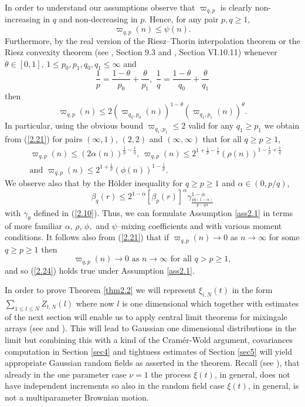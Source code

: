 In order to understand our assumptions observe that $\varpi_{q,p}$
 is clearly non-increasing in $q$ and non-decreasing in $p$. Hence,
 for any pair $p,q\geq 1$,
 \[
 \varpi_{q,p}(n)\leq\psi(n).
 \]
 Furthermore, by the real version of the Riesz--Thorin interpolation 
 theorem or the Riesz convexity theorem (see \cite{Ga}, Section 9.3
 and \cite{DS}, Section VI.10.11) whenever $\theta\in[0,1],\, 1\leq
 p_0,p_1,q_0,q_1\leq\infty$ and
 \[
 \frac 1p=\frac {1-\theta}{p_0}+\frac \theta{p_1},\,\,\frac 1q=\frac
 {1-\theta}{q_0}+\frac \theta{q_1}
 \]
 then
 \begin{equation}\label{2.21}
\varpi_{q,p}(n)\le 2(\varpi_{q_0,p_0}(n))^{1-\theta}
(\varpi_{q_1,p_1}(n))^\theta.
\end{equation}
In particular,  using the obvious bound $\varpi_{q_1,p_1}\leq 2$
valid for any $q_1\geq p_1$ we obtain from (\ref{2.21}) for pairs
$(\infty,1)$, $(2,2)$ and $(\infty,\infty)$ that for all $q\geq p\geq 1$,
 \begin{eqnarray}\label{2.22}
&\varpi_{q,p}(n)\le (2\alpha(n))^{\frac{1}{p}-\frac{1}{q}},\,
 \varpi_{q,p}(n)\le 2^{1+\frac 1p-\frac 1q}(\rho(n))^{1-\frac 1p+\frac 1q}\\
&\mbox{and}\,\,\varpi_{q,p}(n)\le 2^{1+\frac 1p}(\phi(n))^{1-\frac 1p}.
\nonumber\end{eqnarray}
We observe also that by the H\" older inequality for $q\geq p\geq 1$
and $\alpha\in(0,p/q)$,
\begin{equation}\label{2.23}
\beta_q(r)\le 2^{1-\alpha}  [\beta_p(r)]^\alpha \gamma^{1-{{\alpha}}}_{\frac{pq(1-{{\alpha}})}
{p-q{{\alpha}}}}
\end{equation}
with $\gamma_\theta$ defined in (\ref{2.10}). Thus, we can formulate 
Assumption \ref{ass2.1} in terms of more familiar $\alpha,\,\rho,\,\phi,$
and $\psi$--mixing coefficients and with various moment conditions. It 
follows also from (\ref{2.21}) that if $\varpi_{q,p}(n)\to 0$ as $n\to\infty$
for some $q\geq p\geq 1$ then
\begin{equation}\label{2.24}
\varpi_{q,p}(n)\to 0\,\,\mbox{as}\,\, n\to\infty\,\,\mbox{for all}\,\,
q> p\geq 1,
\end{equation}
and so (\ref{2.24}) holds true under Assumption \ref{ass2.1}.

In order to prove Theorem \ref{thm2.2} we will represent $\xi_{i,N}(t)$ 
in the form $\sum_{1\leq l\leq N}Z_{t,N}(l)$ where now $l$ is one dimensional
which together with estimates of the next section will enable us to apply 
central limit theorems for mixingale arrays (see \cite{ML1} and \cite{ML2}). 
This will lead to Gaussian one dimensional distributions in the limit but 
combining this with a kind of the Cram\' er-Wold argument, covariances 
computation in Section \ref{sec4} and tightness estimates of Section \ref{sec5}
will yield appropriate Gaussian random fields as asserted in the theorem.
Recall (see \cite{KV}), that already in the one parameter case $\nu=1$ the
process $\xi(t)$, in general, does not have independent increments so also
in the random field case $\xi(t)$, in general, is not a multiparameter
Brownian motion.

